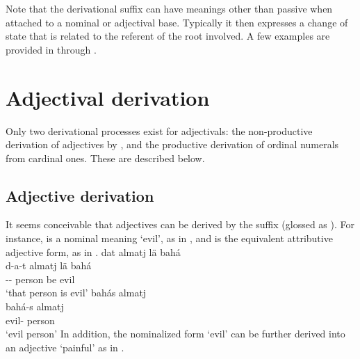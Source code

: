 Note that the derivational suffix  can have meanings other than passive when attached to a nominal or adjectival base. Typically it then expresses a change of state that is related to the referent of the root involved. A few examples are provided in  through . 
\ea\label{vblzDUVVex5}
\z
\ea\label{vblzDUVVex6}
\z
\ea\label{vblzDUVVex7}
\z
\ea\label{vblzDUVVex8}
\z
{}


\section{Adjectival derivation}\label{adjDerivation}
Only two derivational processes exist for adjectivals: the non-productive derivation of adjectives by , and the productive derivation of ordinal numerals from cardinal ones. 
These are described below. 

\subsection{Adjective derivation}\label{ATTRadjDerivation}
It seems conceivable that adjectives can be derived by the suffix \mbox{} (glossed as ). 
For instance,  is a nominal meaning ‘evil’, as in , and  is the equivalent attributive adjective form, as in . 
\ea\label{derivADJex1}
\glll	dat almatj lä bahá\\
	d-a-t almatj lä bahá\\
	-- person\BS{} be\BS{} evil\BS{} \\\nopagebreak
\trans	‘that person is evil’	
\z
\ea\label{derivADJex2}
\glll	bahás almatj\\
	bahá-s almatj\\
	evil- person\BS{}\\\nopagebreak
\trans	‘evil person’	
\z
In addition, the nominalized form  ‘evil’ can be further derived into an adjective  ‘painful’ as in . %
\ea\label{derivADJex3}
\z

